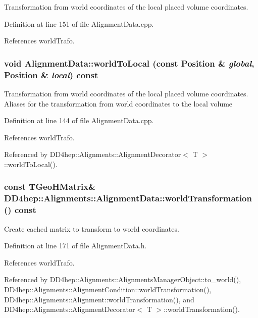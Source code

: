 Transformation from world coordinates of the local placed volume coordinates. 

Definition at line 151 of file AlignmentData.cpp.

References worldTrafo.\hypertarget{class_d_d4hep_1_1_alignments_1_1_alignment_data_affd38849676e68e49f5455b003d0e9ad}{
\subsubsection[{worldToLocal}]{\setlength{\rightskip}{0pt plus 5cm}void AlignmentData::worldToLocal (const Position \& {\em global}, \/  Position \& {\em local}) const}}
\label{class_d_d4hep_1_1_alignments_1_1_alignment_data_affd38849676e68e49f5455b003d0e9ad}


Transformation from world coordinates of the local placed volume coordinates. Aliases for the transformation from world coordinates to the local volume 

Definition at line 144 of file AlignmentData.cpp.

References worldTrafo.

Referenced by DD4hep::Alignments::AlignmentDecorator$<$ T $>$::worldToLocal().\hypertarget{class_d_d4hep_1_1_alignments_1_1_alignment_data_ab650514d7615e907409fa397e43989f7}{
\subsubsection[{worldTransformation}]{\setlength{\rightskip}{0pt plus 5cm}const TGeoHMatrix\& DD4hep::Alignments::AlignmentData::worldTransformation () const}}
\label{class_d_d4hep_1_1_alignments_1_1_alignment_data_ab650514d7615e907409fa397e43989f7}


Create cached matrix to transform to world coordinates. 

Definition at line 171 of file AlignmentData.h.

References worldTrafo.

Referenced by DD4hep::Alignments::AlignmentsManagerObject::to\_\-world(), DD4hep::Alignments::AlignmentCondition::worldTransformation(), DD4hep::Alignments::Alignment::worldTransformation(), and DD4hep::Alignments::AlignmentDecorator$<$ T $>$::worldTransformation().

